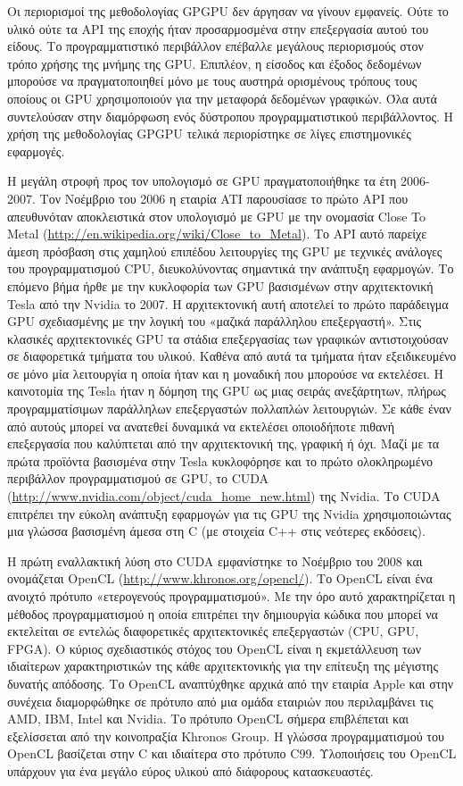 Οι περιορισμοί της μεθοδολογίας GPGPU δεν άργησαν να γίνουν εμφανείς. Ούτε το υλικό ούτε τα API της εποχής ήταν προσαρμοσμένα στην επεξεργασία αυτού του είδους. Το προγραμματιστικό περιβάλλον επέβαλλε μεγάλους περιορισμούς στον τρόπο χρήσης της μνήμης της GPU. Επιπλέον, η είσοδος και έξοδος δεδομένων μπορούσε να πραγματοποιηθεί μόνο με τους αυστηρά ορισμένους τρόπους τους οποίους οι GPU χρησιμοποιούν για την μεταφορά δεδομένων γραφικών. Όλα αυτά συντελούσαν στην διαμόρφωση ενός δύστροπου προγραμματιστικού περιβάλλοντος. Η χρήση της μεθοδολογίας GPGPU τελικά περιορίστηκε σε λίγες επιστημονικές εφαρμογές.

Η μεγάλη στροφή προς τον υπολογισμό σε GPU πραγματοποιήθηκε τα έτη 2006-2007. Τον Νοέμβριο του 2006 η εταιρία ATI παρουσίασε το πρώτο API που απευθυνόταν αποκλειστικά στον υπολογισμό με GPU με την ονομασία Close To Metal (\url{http://en.wikipedia.org/wiki/Close_to_Metal}). Το API αυτό παρείχε άμεση πρόσβαση στις χαμηλού επιπέδου λειτουργίες της GPU με τεχνικές ανάλογες του προγραμματισμού CPU, διευκολύνοντας σημαντικά την ανάπτυξη εφαρμογών. Το επόμενο βήμα ήρθε με την κυκλοφορία των GPU βασισμένων στην αρχιτεκτονική Tesla από την Νvidia το 2007. Η αρχιτεκτονική αυτή αποτελεί το πρώτο παράδειγμα GPU σχεδιασμένης με την λογική του «μαζικά παράλληλου επεξεργαστή». Στις κλασικές αρχιτεκτονικές GPU τα στάδια επεξεργασίας των γραφικών αντιστοιχούσαν σε διαφορετικά τμήματα του υλικού. Καθένα από αυτά τα τμήματα ήταν εξειδικευμένο σε μόνο μία λειτουργία η οποία ήταν και η μοναδική που μπορούσε να εκτελέσει. Η καινοτομία της Tesla ήταν η δόμηση της GPU ως μιας σειράς ανεξάρτητων, πλήρως προγραμματίσιμων παράλληλων 
επεξεργαστών πολλαπλών λειτουργιών. Σε κάθε έναν από αυτούς μπορεί να  ανατεθεί δυναμικά να εκτελέσει οποιοδήποτε πιθανή επεξεργασία που καλύπτεται από την αρχιτεκτονική της, γραφική ή όχι. Μαζί με τα πρώτα προϊόντα βασισμένα στην Tesla κυκλοφόρησε και το πρώτο ολοκληρωμένο περιβάλλον προγραμματισμού σε GPU, το CUDA (\url{http://www.nvidia.com/object/cuda_home_new.html}) της Nvidia. Το CUDA επιτρέπει την εύκολη ανάπτυξη εφαρμογών για τις GPU της Nvidia χρησιμοποιώντας μια γλώσσα βασισμένη άμεσα στη C (με στοιχεία C++ στις νεότερες εκδόσεις).

Η πρώτη εναλλακτική λύση στο CUDA εμφανίστηκε το Νοέμβριο του 2008 και ονομάζεται OpenCL (\url{http://www.khronos.org/opencl/}). Το OpenCL είναι ένα ανοιχτό πρότυπο «ετερογενούς προγραμματισμού». Με την όρο αυτό χαρακτηρίζεται η μέθοδος προγραμματισμού η οποία επιτρέπει την δημιουργία κώδικα που μπορεί να εκτελείται σε εντελώς διαφορετικές αρχιτεκτονικές επεξεργαστών (CPU, GPU, FPGA). O κύριος σχεδιαστικός στόχος του OpenCL είναι η εκμετάλλευση των ιδιαίτερων χαρακτηριστικών της κάθε αρχιτεκτονικής για την επίτευξη της μέγιστης δυνατής απόδοσης. Το OpenCL αναπτύχθηκε αρχικά από την εταιρία Apple και στην συνέχεια διαμορφώθηκε σε πρότυπο από μια ομάδα εταιριών που περιλαμβάνει τις AMD, IBM, Intel και Nvidia. Το πρότυπο OpenCL σήμερα επιβλέπεται και εξελίσσεται από την κοινοπραξία Khronos Group. Η γλώσσα προγραμματισμού του OpenCL βασίζεται στην C και ιδιαίτερα στο πρότυπο C99. Υλοποιήσεις του OpenCL υπάρχουν για ένα μεγάλο εύρος υλικού από διάφορους κατασκευαστές.

